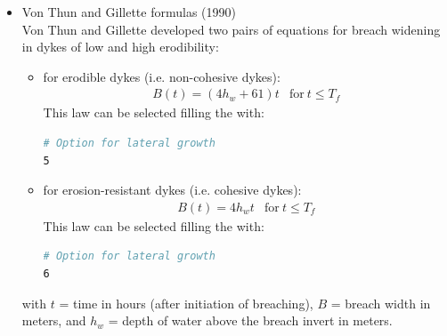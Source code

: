 \begin{itemize}
\item Von Thun and Gillette formulas (1990) \\
Von Thun and Gillette \cite{VonThun1990} developed two pairs of equations for
breach widening in dykes of low and high erodibility:
\begin{itemize}
\item for erodible dykes (i.e. non-cohesive dykes):
\begin{equation}
\begin{array}{lc}
B(t)=(4h_w+61)t & \text{for}~t\leq T_f
\end{array}
\end{equation}
This law can be selected filling the  with:
\begin{lstlisting}[language=bash]
# Option for lateral growth
5
\end{lstlisting}
\item for erosion-resistant dykes (i.e. cohesive dykes):
\begin{equation}
\begin{array}{lc}
B(t)=4h_wt & \text{for}~t\leq T_f
\end{array}
\end{equation}
This law can be selected filling the  with:
\begin{lstlisting}[language=bash]
# Option for lateral growth
6
\end{lstlisting}
\end{itemize}
with $t$ = time in hours (after initiation of breaching), $B$ = breach width in
meters, and $h_w$ = depth of water above the breach invert in meters.


\end{itemize}
